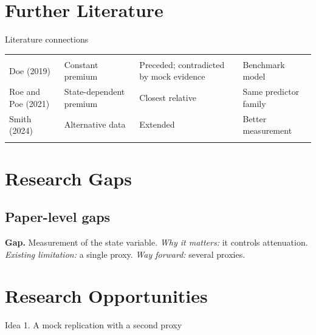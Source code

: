 \documentclass{lrreview}
\begin{document}
\section{Further Literature}
\begin{lrtable}{Literature connections}
\begin{tabularx}{\linewidth}{@{}L L L L@{}}
\lrtoprule
{} &  &  & \\
\lrheadrule
Doe (2019) & Constant premium & Preceded; contradicted by mock evidence & Benchmark model\\
\lrrowrule
Roe and Poe (2021) & State-dependent premium & Closest relative & Same predictor family\\
\lrrowrule
Smith (2024) & Alternative data & Extended & Better measurement\\
\lrbottomrule
\end{tabularx}
\end{lrtable}

\section{Research Gaps}
\subsection{Paper-level gaps}
\textbf{Gap.} Measurement of the state variable. \emph{Why it matters:} it controls
attenuation. \emph{Existing limitation:} a single proxy. \emph{Way forward:} several proxies.

\section{Research Opportunities}

\begin{lridea}{Idea 1. A mock replication with a second proxy}
\end{lridea}
\end{document}
